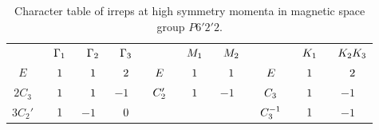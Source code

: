 \documentclass[12pt]{report}
\begin{document}
\begin{table}[H]
\caption{Character table of irreps at high symmetry momenta in magnetic space group $P6'2'2$.}
\centering
\begin{tabular} { c c c c | c c c | c c c }
\cline{1-10}
$\P$ & $\P \Gamma_1$ & $\P \Gamma_2$ & $\P \Gamma_3$ & $\P$ & $\P M_1$ & $\P M_2$ & $\P$ & $\P K_1$ & $\P K_2K_3$ \\
\cline{1-10}
$E$ & $\P1$ & $\P1$ & $\P2$ & $\P E$ & $\P1$ & $\P1$ & $\P E$ & $\P1$ & $\P2$ \\
$2 C_3$ & $\P1$ & $\P1$ & $ -1$ & $\P C_2'$ & $\P1$ & $ -1$ & $\P C_3$ & $\P1$ & $ -1$ \\
$3 C_2'$ & $\P1$ & $ -1$ & $\P0$ & $\P$ & $\P$ & $\P$ & $\P C_3^{-1}$ & $\P1$ & $-1$ \\
\cline{1-10}
\end{tabular}
\label{tab:char-P6'2'2}
\end{table}
\end{document}
